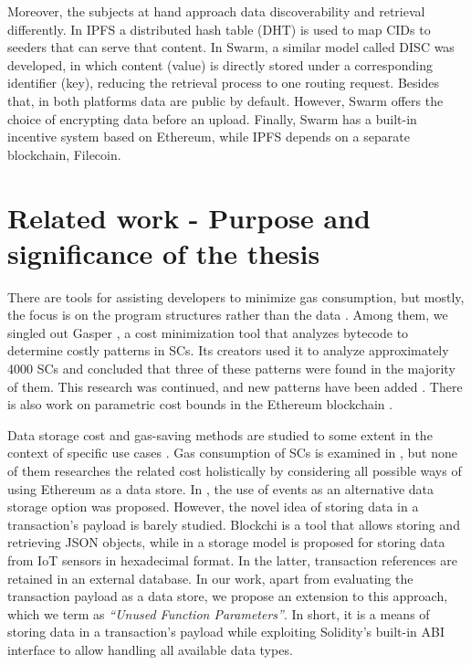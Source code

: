 Moreover, the subjects at hand approach data discoverability and retrieval differently. In IPFS a distributed hash table (DHT)  \citep{benet_2014} is used to map CIDs to seeders that can serve that content. In Swarm, a similar model called DISC  \citep{tron_2020} was developed, in which content (value) is directly stored under a corresponding identifier (key), reducing the retrieval process to one routing request. Besides that, in both platforms data are public by default. However, Swarm offers the choice of encrypting data before an upload. Finally, Swarm has a built-in incentive system based on Ethereum, while IPFS depends on a separate blockchain, Filecoin. 

\section{Related work - Purpose and significance of the thesis}\label{sec:related_work}
There are tools for assisting developers to minimize gas consumption, but mostly, the focus is on the program structures rather than the data  \citep{nelaturu_2021, chen_2017, chen_2021}. Among them, we singled out Gasper  \citep{chen_2017}, a cost minimization tool that analyzes bytecode to determine costly patterns in SCs. Its creators used it to analyze approximately 4000 SCs and concluded that three of these patterns were found in the majority of them. This research was continued, and new patterns have been added  \citep{chen_2021}. There is also work on parametric cost bounds in the Ethereum blockchain \citep{albert_2021}.

Data storage cost and gas-saving methods are studied to some extent in the context of specific use cases  \citep{kurt_2020, delgado_2019, westerkamp_2020}. Gas consumption of SCs is examined in  \citep{grech_2020, signer_2018}, but none of them researches the related cost holistically by considering all possible ways of using Ethereum as a data store. In  \citep{consensys}, the use of events as an alternative data storage option was proposed. However, the novel idea of storing data in a transaction’s payload is barely studied. Blockchi \citep{yankov_2018} is a tool that allows storing and retrieving JSON objects, while in  \citep{xie_2017} a storage model is proposed for storing data from IoT sensors in hexadecimal format. In the latter, transaction references are retained in an external database. In our work, apart from evaluating the transaction payload as a data store, we propose an extension to this approach, which we term as \emph{``Unused Function Parameters''}. In short, it is a means of storing data in a transaction's payload while exploiting Solidity's built-in ABI interface to allow handling all available data types.

